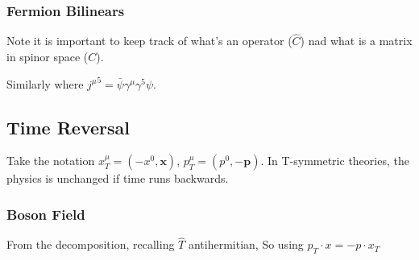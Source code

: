\documentclass{article}
\begin{document}
\subsubsection*{Fermion Bilinears}
Note it is important to keep track of what's an operator ($\hat{C}$) nad what is a matrix in spinor space ($C$). 
\begin{example}
Similarly 
where ${j^\mu}^5 = \bar{\psi} \gamma^\mu \gamma^5 \psi$.
\end{example}

\subsection{Time Reversal}
Take the notation $x^\mu_T = (-x^0, \bm{x})$, $p^\mu_T = (p^0, -\bm{p})$. In T-symmetric theories, the physics is unchanged if time runs backwards. 

\subsubsection*{Boson Field}
From the decomposition, recalling $\hat{T}$ antihermitian, 
So using $p_T \cdot x  = -p\cdot x_T$ 
\end{document}

